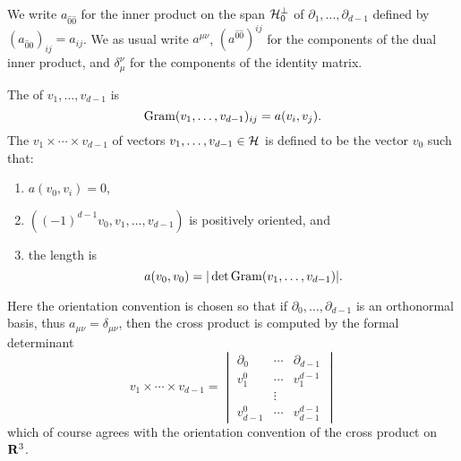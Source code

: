 We write $a_{\hat 0 \hat 0}$ for the inner product on the span $\mathcal H_0^\perp$ of $\partial_1, \dots, \partial_{d - 1}$ defined by $(a_{\hat 0 \hat 0})_{ij} = a_{ij}$.
We as usual write $a^{\mu\nu}$, $(a^{\hat 0 \hat 0})^{ij}$ for the components of the dual inner product, and $\delta_\mu^\nu$ for the components of the identity matrix.

\begin{definition}
The  of $v_1, \dots, v_{d - 1}$ is
$$\operatorname{Gram}(v_1, \dots, v_{d - 1})_{ij} = a(v_i, v_j).$$
The  $v_1 \times \cdots \times v_{d - 1}$ of vectors $v_1, \dots, v_{d - 1} \in \mathcal H$ is defined to be the vector $v_0$
such that:
\begin{enumerate}
\item $a(v_0, v_i) = 0$,
\item $((-1)^{d - 1} v_0, v_1, \dots, v_{d - 1})$ is positively oriented, and
\item the length is
$$a(v_0, v_0) = |\det \operatorname{Gram}(v_1, \dots, v_{d - 1})|.$$
\end{enumerate}
\end{definition}

Here the orientation convention is chosen so that if $\partial_0, \dots, \partial_{d - 1}$ is an orthonormal basis, thus $a_{\mu\nu} = \delta_{\mu\nu}$, then the cross product is computed by the formal determinant
\begin{equation}\label{formal determinant}
v_1 \times \cdots \times v_{d - 1} = \begin{vmatrix}\partial_0 & \cdots & \partial_{d - 1} \\
v_1^0 & \cdots & v_1^{d - 1}\\
& \vdots \\
v_{d - 1}^0 & \cdots & v_{d - 1}^{d - 1}\end{vmatrix}
\end{equation}
which of course agrees with the orientation convention of the cross product on $\mathbf{R}^3$.

